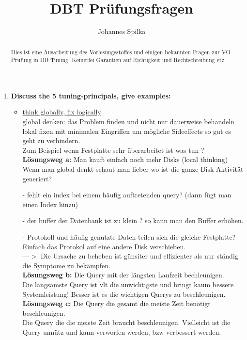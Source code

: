 \documentclass[12pt]{article}\pagestyle{myheadings}
\title{DBT Prüfungsfragen}
\author{Johannes Spilka}
\theoremstyle{plain}
\begin{document}
\maketitle
\begin{abstract}
Dies ist eine Ausarbeitung des Vorlesungsstoffes und einigen bekannten Fragen zur VO Prüfung in DB Tuning. Keinerlei Garantien auf Richtigkeit und Rechtschreibung etz.
\end{abstract}

\begin{enumerate}

\item \textbf{Discuss the 5 tuning-principals, give examples:} \\
\begin{itemize}
\item \underline{think globally, fix logically}\\
global denken: das Problem finden und nicht nur dauerweise behandeln\\
lokal fixen mit minimalen Eingriffen um mögliche Sideeffects so gut es geht zu verhindern.\\
Zum Beispiel wenn Festplatte sehr überarbeitet ist was tun ?
\textbf{Lösungsweg a:} Man kauft einfach noch mehr Disks (local thinking)\\
Wenn man global denkt schaut man lieber wo ist die ganze Disk Aktivität generiert?\\
\item[-]fehlt ein index bei einem häufig auftretenden query? (dann fügt man einen Index hinzu)
\item[-]der buffer der Datenbank ist zu klein ? so kann man den Buffer erhöhen.
\item[-]Protokoll und häufig genutzte Daten teilen sich die gleiche Festplatte? Einfach das Protokol auf eine andere Disk verschieben.\\
---$>$ Die Ursache zu beheben ist günsiter und effizienter als nur ständig die Symptome zu bekämpfen.\\
\textbf{Lösungsweg b:} Die Query mit der längsten Laufzeit bechleunigen.\\
Die langsamste Query ist vlt die unwichtigste und bringt kaum bessere Systemleistung! Besser ist es die wichtigen Querys zu beschleunigen.\\
\textbf{Lösungsweg c:} Die Query die gesamt die meiste Zeit benötigt beschleunigen.\\Die Query die die meiste Zeit braucht beschleunigen.
Vielleicht ist die Query unnütz und kann verworfen werden, bzw verbessert werden.\\ \\

\end{itemize}
\end{enumerate}
\end{document}
